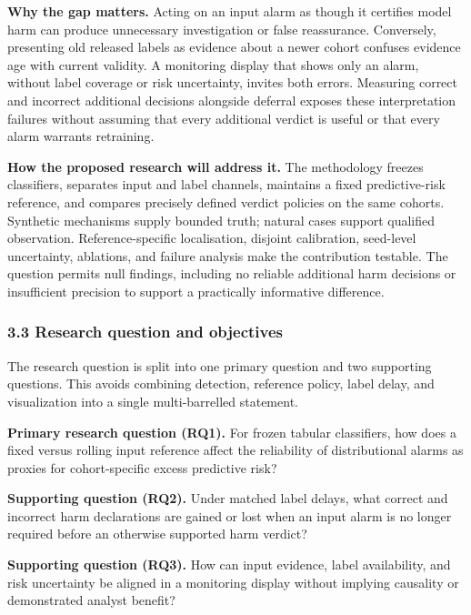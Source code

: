 \documentclass[
]{article}
\begin{document}
\textbf{Why the gap matters.} Acting on an input alarm as though it
certifies model harm can produce unnecessary investigation or false
reassurance. Conversely, presenting old released labels as evidence
about a newer cohort confuses evidence age with current validity. A
monitoring display that shows only an alarm, without label coverage or
risk uncertainty, invites both errors. Measuring correct and incorrect
additional decisions alongside deferral exposes these interpretation
failures without assuming that every additional verdict is useful or
that every alarm warrants retraining.

\textbf{How the proposed research will address it.} The methodology
freezes classifiers, separates input and label channels, maintains a
fixed predictive-risk reference, and compares precisely defined verdict
policies on the same cohorts. Synthetic mechanisms supply bounded truth;
natural cases support qualified observation. Reference-specific
localisation, disjoint calibration, seed-level uncertainty, ablations,
and failure analysis make the contribution testable. The question
permits null findings, including no reliable additional harm decisions
or insufficient precision to support a practically informative
difference.

\hypertarget{research-question-and-objectives}{%
\subsubsection{3.3 Research question and
objectives}\label{research-question-and-objectives}}

The research question is split into one primary question and two
supporting questions. This avoids combining detection, reference policy,
label delay, and visualization into a single multi-barrelled statement.

\textbf{Primary research question (RQ1).} For frozen tabular
classifiers, how does a fixed versus rolling input reference affect the
reliability of distributional alarms as proxies for cohort-specific
excess predictive risk?

\textbf{Supporting question (RQ2).} Under matched label delays, what
correct and incorrect harm declarations are gained or lost when an input
alarm is no longer required before an otherwise supported harm verdict?

\textbf{Supporting question (RQ3).} How can input evidence, label
availability, and risk uncertainty be aligned in a monitoring display
without implying causality or demonstrated analyst benefit?
\end{document}
